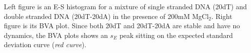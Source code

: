 \label{fig:bva_static}  Left figure is an E-S histogram for a mixture of single stranded DNA (20dT) and double stranded DNA (20dT-20dA) in the presence of 200mM MgCl$_2$. Right figure is its BVA plot. Since both 20dT and 20dT-20dA are stable and have no dynamics, the BVA plots shows an $s_E$ peak sitting on the expected standard deviation curve (\textit{red curve}).